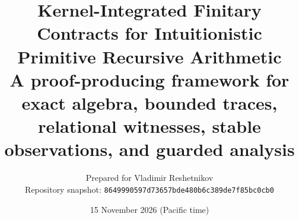 \documentclass[11pt,oneside]{article}
\title{\textbf{Kernel-Integrated Finitary Contracts for Intuitionistic Primitive Recursive Arithmetic}\\[0.4em]\large A proof-producing framework for exact algebra, bounded traces, relational witnesses, stable observations, and guarded analysis}
\author{Prepared for Vladimir Reshetnikov\\Repository snapshot: \texttt{8649990597d73657bde480b6c389de7f85bc0cb0}}
\date{15 November 2026 (Pacific time)}
\begin{document}
\maketitle
\begin{abstract}

\end{abstract}
\tableofcontents
\newpage

















\appendix



\end{document}

